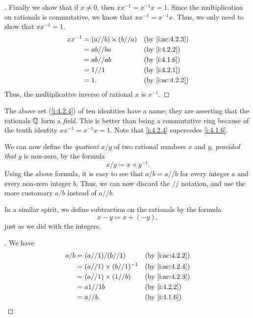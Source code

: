 \begin{proof}[]
  Finally we show that if \(x \neq 0\), then \(xx^{-1} = x^{-1}x = 1\).
  Since the multiplication on rationals is commutative, we know that \(xx^{-1} = x^{-1}x\).
  Thus, we only need to show that \(xx^{-1} = 1\).
  \begin{align*}
    xx^{-1} & = (a // b) \times (b // a) &  & \by{i:ac:4.2.3} \\
            & = ab // ba                 &  & \by{i:4.2.2}    \\
            & = ab // ab                 &  & \by{i:4.1.6}    \\
            & = 1 // 1                   &  & \by{i:4.2.1}    \\
            & = 1.                       &  & \by{i:ac:4.2.2}
  \end{align*}
  Thus, the multiplicative inverse of rational \(x\) is \(x^{-1}\).
\end{proof}

\begin{rmk}\label{i:4.2.5}
  The above set (\cref{i:4.2.4}) of ten identities have a name;
  they are asserting that the rationals \(\mathbb{Q}\) form a \emph{field}.
  This is better than being a commutative ring because of the tenth identity \(xx^{-1} = x^{-1}x = 1\).
  Note that \cref{i:4.2.4} supercedes \cref{i:4.1.6}.
\end{rmk}

\begin{ac}\label{i:ac:4.2.4}
  We can now define the \emph{quotient} \(x / y\) of two rational numbers \(x\) and \(y\), \emph{provided that} \(y\) is non-zero, by the formula
  \[
    x / y \coloneqq x \times y^{-1}.
  \]
  Using the above formula, it is easy to see that \(a / b = a // b\) for every integer \(a\) and every non-zero integer \(b\).
  Thus, we can now discard the \(//\) notation, and use the more customary \(a / b\) instead of \(a // b\).

  In a similar spirit, we define subtraction on the rationals by the formula
  \[
    x - y \coloneqq x + (-y),
  \]
  just as we did with the integers.
\end{ac}

\begin{proof}[]
  We have
  \begin{align*}
    a / b & = (a // 1) / (b // 1)           &  & \by{i:ac:4.2.2} \\
          & = (a // 1) \times (b // 1)^{-1} &  & \by{i:ac:4.2.4} \\
          & = (a // 1) \times (1 // b)      &  & \by{i:ac:4.2.3} \\
          & = a1 // 1b                      &  & \by{i:4.2.2}    \\
          & = a // b.                       &  & \by{i:4.1.6}
  \end{align*}
\end{proof}

